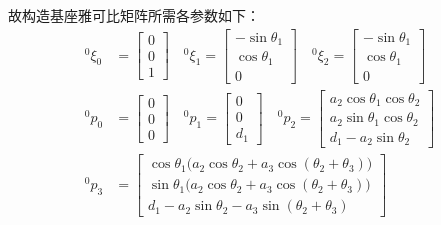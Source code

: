 \documentclass[UTF8, 12pt]{ctexart}
\begin{document}
故构造基座雅可比矩阵所需各参数如下：
\[
\begin{aligned}
    {}^0 \xi_0 &= \begin{bmatrix}
                    0 \\ 0 \\ 1
                \end{bmatrix} \quad
    {}^0 \xi_1 = \begin{bmatrix}
                    -\sin\theta_1 \\ \cos\theta_1 \\ 0
                \end{bmatrix} \quad
    {}^0 \xi_2 = \begin{bmatrix}
                    -\sin\theta_1 \\ \cos\theta_1 \\ 0
                \end{bmatrix} \\
    {}^0 p_0 &= \begin{bmatrix}
                    0 \\ 0 \\ 0
                \end{bmatrix} \quad
    {}^0 p_1 = \begin{bmatrix}
                    0 \\ 0 \\ d_1
                \end{bmatrix} \quad
    {}^0 p_2 = \begin{bmatrix}
                    a_2\cos\theta_1\cos\theta_2 \\
                    a_2\sin\theta_1\cos\theta_2 \\
                    d_1 - a_2\sin\theta_2
                \end{bmatrix} \\
    {}^0 p_3 &= \begin{bmatrix}
                    \cos\theta_1\big(a_2\cos\theta_2 + a_3\cos(\theta_2+\theta_3)\big) \\
                    \sin\theta_1\big(a_2\cos\theta_2 + a_3\cos(\theta_2+\theta_3)\big) \\
                    d_1 - a_2\sin\theta_2 - a_3\sin(\theta_2+\theta_3)
                \end{bmatrix} \\
\end{aligned}
\]
\end{document}
